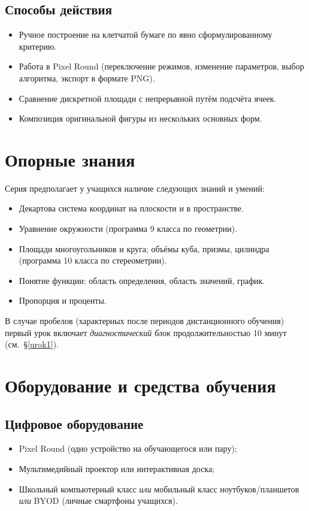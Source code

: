 \documentclass[12pt,a4paper]{scrartcl}
\begin{document}
\subsection{Способы действия}
\begin{itemize}[leftmargin=1.3em,itemsep=0.15em,topsep=0.3em]
  \item Ручное построение на клетчатой бумаге по явно сформулированному критерию.
  \item Работа в Pixel Round (переключение режимов, изменение параметров, выбор алгоритма, экспорт в формате PNG).
  \item Сравнение дискретной площади с непрерывной путём подсчёта ячеек.
  \item Композиция оригинальной фигуры из нескольких основных форм.
\end{itemize}

\section{Опорные знания}

Серия предполагает у учащихся наличие следующих знаний и умений:

\begin{itemize}[leftmargin=1.3em,itemsep=0.15em,topsep=0.3em]
  \item Декартова система координат на плоскости и в пространстве.
  \item Уравнение окружности (программа 9 класса по геометрии).
  \item Площади многоугольников и круга; объёмы куба, призмы, цилиндра (программа 10 класса по стереометрии).
  \item Понятие функции: область определения, область значений, график.
  \item Пропорция и проценты.
\end{itemize}

В случае пробелов (характерных после периодов дистанционного обучения) первый урок включает \emph{диагностический блок} продолжительностью 10 минут (см.~§\ref{urok1}).

\section{Оборудование и средства обучения}

\subsection{Цифровое оборудование}
\begin{itemize}[leftmargin=1.3em,itemsep=0.15em,topsep=0.3em]
  \item Pixel Round (одно устройство на обучающегося или пару);
  \item Мультимедийный проектор или интерактивная доска;
  \item Школьный компьютерный класс \emph{или} мобильный класс ноутбуков/планшетов \emph{или} BYOD (личные смартфоны учащихся).
\end{itemize}
\end{document}
